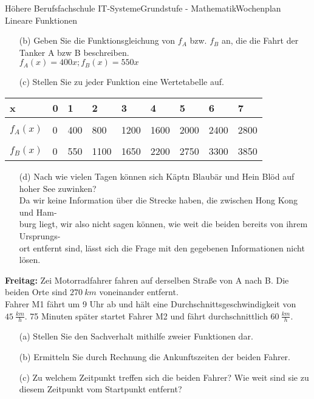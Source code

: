 \documentclass[oneside,openany,headings=optiontotoc,11pt,numbers=noenddot]{scrreprt}
\begin{document}
\begin{worksheet}{Höhere Berufsfachschule IT-Systeme}{Grundstufe - Mathematik}{Wochenplan Lineare Funktionen}
\begin{framed}
\begin{itemize}
				\item[(b)] Geben Sie die Funktionsgleichung von \(f_A\) bzw. \(f_B\) an, die die Fahrt der Tanker A bzw B beschreiben.\\
				\colorbox{green!10}{\(f_A(x) = 400x; f_B(x) = 550x\)}
				\item[(c)] Stellen Sie zu jeder Funktion eine Wertetabelle auf.
			\end{itemize}
			\begin{tabularx}{\textwidth}{l|l|l|l|l|l|l|l|l}
				x & 0 & 1 & 2 & 3 & 4 & 5 & 6 & 7\\
				\hline
				& & & & & & & &\\
				\(f_A(x)\) & 0 & 400 & 800 & 1200 & 1600 & 2000 & 2400 & 2800\\
				\hline
				& & & & & & & &\\
				\(f_B(x)\) & 0 & 550 & 1100 & 1650 & 2200 & 2750 & 3300 & 3850\\
			\end{tabularx}
			\begin{itemize}
				\item[(d)] Nach wie vielen Tagen können  sich Käpt\grq{}n Blaubär und Hein Blöd auf hoher See zuwinken?\\
				\colorbox{red!10}{Da wir keine Information über die Strecke haben, die zwischen Hong Kong und Ham-}\\
				\colorbox{red!10}{burg liegt, wir also nicht sagen können, wie weit die beiden bereits von ihrem Ursprungs-}\\
				\colorbox{red!10}{ort entfernt sind, lässt sich die Frage mit den gegebenen Informationen nicht lösen.}
			\end{itemize}
		\end{framed}
		\begin{framed}
			\noindent
			\textbf{Freitag:} Zei Motorradfahrer fahren auf derselben Straße von A nach B. Die beiden Orte sind \(270\ km\) voneinander entfernt.\\
			Fahrer M1 fährt um 9 Uhr ab und hält eine Durchschnittsgeschwindigkeit von \(45\ \frac{km}{h}\). 75 Minuten später startet Fahrer M2 und fährt durchschnittlich \(60\ \frac{km}{h}\).
			\begin{itemize}
				\item[(a)] Stellen Sie den Sachverhalt mithilfe zweier Funktionen dar.
				\item[(b)] Ermitteln Sie durch Rechnung die Ankunftszeiten der beiden Fahrer.
				\item[(c)] Zu welchem Zeitpunkt treffen sich die beiden Fahrer? Wie weit sind sie zu diesem Zeitpunkt vom Startpunkt entfernt?
			\end{itemize}
		\end{framed}
	\end{worksheet}
\end{document}
